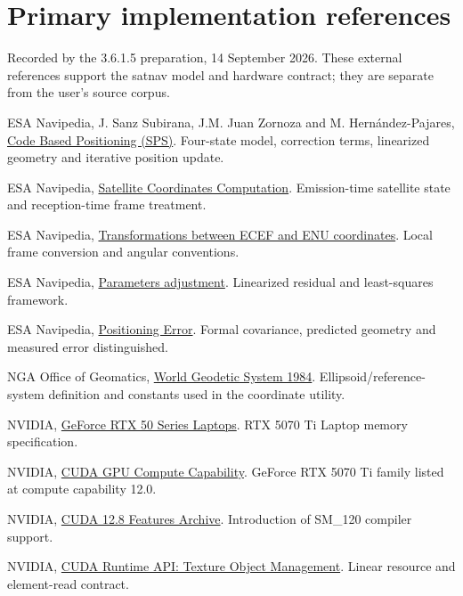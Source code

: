 \section*{Primary implementation references}
Recorded by the 3.6.1.5 preparation, 14 September 2026. These external references support the satnav model and
hardware contract; they are separate from the user's source corpus.
\small
\begin{description}[style=nextline,leftmargin=8mm]
\item[G1] ESA Navipedia, J. Sanz Subirana, J.M. Juan Zornoza and M. Hern\'andez-Pajares,
\href{https://gssc.esa.int/navipedia/index.php?title=Code_Based_Positioning_(SPS)}{Code Based Positioning (SPS)}.
Four-state model, correction terms, linearized geometry and iterative position update.
\item[G2] ESA Navipedia, \href{https://gssc.esa.int/navipedia/index.php/Satellite_Coordinates_Computation}{Satellite Coordinates Computation}.
Emission-time satellite state and reception-time frame treatment.
\item[G3] ESA Navipedia, \href{https://gssc.esa.int/navipedia/index.php/Transformations_between_ECEF_and_ENU_coordinates}{Transformations between ECEF and ENU coordinates}.
Local frame conversion and angular conventions.
\item[G4] ESA Navipedia, \href{https://gssc.esa.int/navipedia/index.php?title=Parameters_adjustment}{Parameters adjustment}.
Linearized residual and least-squares framework.
\item[G5] ESA Navipedia, \href{https://gssc.esa.int/navipedia/index.php/Positioning_Error}{Positioning Error}.
Formal covariance, predicted geometry and measured error distinguished.
\item[G6] NGA Office of Geomatics, \href{https://earth-info.nga.mil/index.php?action=wgs84\&dir=wgs84}{World Geodetic System 1984}.
Ellipsoid/reference-system definition and constants used in the coordinate utility.
\item[H1] NVIDIA, \href{https://www.nvidia.com/en-us/geforce/laptops/50-series/}{GeForce RTX 50 Series Laptops}.
RTX 5070 Ti Laptop memory specification.
\item[H2] NVIDIA, \href{https://developer.nvidia.com/cuda/gpus}{CUDA GPU Compute Capability}.
GeForce RTX 5070 Ti family listed at compute capability 12.0.
\item[H3] NVIDIA, \href{https://docs.nvidia.com/cuda/archive/12.8.0/cuda-features-archive/index.html}{CUDA 12.8 Features Archive}.
Introduction of SM\_120 compiler support.
\item[H4] NVIDIA, \href{https://docs.nvidia.com/cuda/cuda-runtime-api/group__CUDART__TEXTURE__OBJECT.html}{CUDA Runtime API: Texture Object Management}.
Linear resource and element-read contract.
\end{description}
\normalsize
